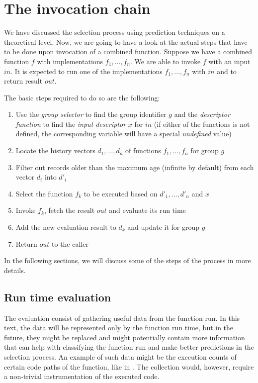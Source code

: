 \section{The invocation chain}
\label{sec:selection_and_invocation_process}

We have discussed the selection process using prediction techniques on a theoretical level. Now, we are going to have a look at the actual steps that have to be done upon invocation of a combined function. Suppose we have a combined function $f$ with implementations $f_1,\dots,f_n$. We are able to invoke $f$ with an input $in$. It is expected to run one of the implementations $f_1,\dots,f_n$ with $in$ and to return result $out$.

The basic steps required to do so are the following:

\begin{enumerate}
	\item Use the \textit{group selector} to find the group identifier $g$ and the \textit{descriptor function} to find the \textit{input descriptor} $x$ for $in$ (if either of the functions is not defined, the corresponding variable will have a special \textit{undefined} value)
	\item Locate the history vectors $d_1,\dots,d_n$ of functions $f_1,\dots,f_n$ for group $g$
	\item Filter out records older than the maximum age (infinite by default) from each vector $d_i$ into $d'_i$
	\item Select the function $f_k$ to be executed based on $d'_1,\dots,d'_n$ and $x$
	\item Invoke $f_k$, fetch the result $out$ and evaluate its run time
	\item Add the new evaluation result to $d_k$ and update it for group $g$
	\item Return $out$ to the caller
\end{enumerate}

In the following sections, we will discuss some of the steps of the process in more details.

\subsection{Run time evaluation}

The evaluation consist of gathering useful data from the function run. In this text, the data will be represented only by the function run time, but in the future, they might be replaced and might potentially contain more information that can help with classifying the function run and make better predictions in the selection process. An example of such data might be the execution counts of certain code paths of the function, like in \cite{chun_mantis:_2010}. The collection would, however, require a non-trivial instrumentation of the executed code.


